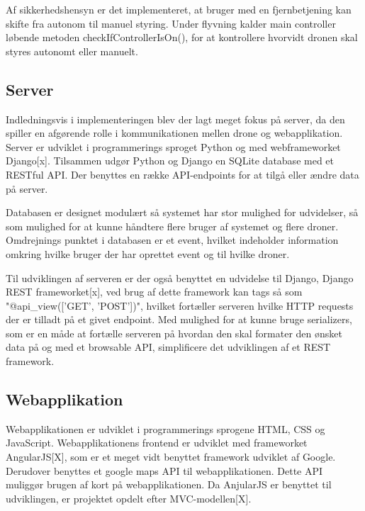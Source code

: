 Af sikkerhedshensyn er det implementeret, at bruger med en fjernbetjening kan skifte fra autonom til manuel styring. Under flyvning kalder main controller løbende metoden checkIfControllerIsOn(), for at kontrollere hvorvidt dronen skal styres autonomt eller manuelt.  

\subsection{Server}
Indledningsvis i implementeringen blev der lagt meget fokus på server, da den spiller en afgørende rolle i kommunikationen mellen drone og webapplikation. 
Server er udviklet i programmerings sproget Python og med webframeworket Django[x].
Tilsammen udgør Python og Django en SQLite database med et RESTful API. Der benyttes en række API-endpoints for at tilgå eller ændre data på server.

Databasen er designet modulært så systemet har stor mulighed for udvidelser, så som mulighed for at kunne håndtere flere bruger af systemet og flere droner. Omdrejnings punktet i databasen er et event, hvilket indeholder information omkring hvilke bruger der har oprettet event og til hvilke droner.

Til udviklingen af serveren er der også benyttet en udvidelse til Django, Django REST frameworket[x], ved brug af dette framework kan tags så som "@api\_view(['GET', 'POST'])", hvilket fortæller serveren hvilke HTTP requests der er tilladt på et givet endpoint. Med mulighed for at kunne bruge serializers, som er en måde at fortælle serveren på hvordan den skal formater den ønsket data på og med et browsable API, simplificere det udviklingen af et REST framework.

\newpage
\subsection{Webapplikation}
Webapplikationen  er udviklet i programmerings sprogene HTML, CSS og JavaScript. Webapplikationens frontend er udviklet med frameworket AngularJS[X], som er et meget vidt benyttet framework udviklet af Google. Derudover benyttes et google maps API til webapplikationen. Dette API muliggør brugen af kort på webapplikationen. Da AnjularJS er benyttet til udviklingen, er projektet opdelt efter MVC-modellen[X]. 

